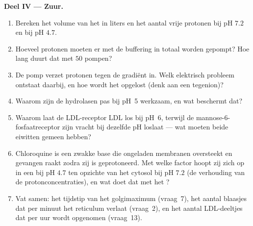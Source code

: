 \begin{problem}
\medskip
\noindent\textbf{Deel IV --- Zuur.}
\begin{enumerate}[resume]
  \item Bereken het volume van het  in liters en het aantal
        vrije protonen bij pH $7.2$ en bij pH $4.7$.
  \item Hoeveel protonen moeten er met de buffering in totaal worden
        gepompt? Hoe lang duurt dat met $50$ pompen?
  \item De pomp verzet protonen tegen de gradiënt in. Welk elektrisch
        probleem ontstaat daarbij, en hoe wordt het opgelost (denk aan
        een tegenion)?
  \item Waarom zijn de hydrolasen pas bij pH~5 werkzaam, en wat
        beschermt dat?
  \item Waarom laat de LDL-receptor LDL los bij pH~6, terwijl de
        mannose-6-fosfaatreceptor zijn vracht bij dezelfde pH loslaat
        --- wat moeten beide eiwitten gemeen hebben?
  \item Chloroquine is een zwakke base die ongeladen membranen
        oversteekt en gevangen raakt zodra zij is geprotoneerd. Met
        welke factor hoopt zij zich op in een  bij pH $4.7$ ten
        opzichte van het cytosol bij pH $7.2$ (de verhouding van de
        protonconcentraties), en wat doet dat met het ?
  \item Vat samen: het tijdstip van het golgimaximum (vraag~7), het
        aantal blaasjes dat per minuut het reticulum verlaat (vraag~2),
        en het aantal LDL-deeltjes dat per uur wordt opgenomen
        (vraag~13).
\end{enumerate}
\end{problem}
